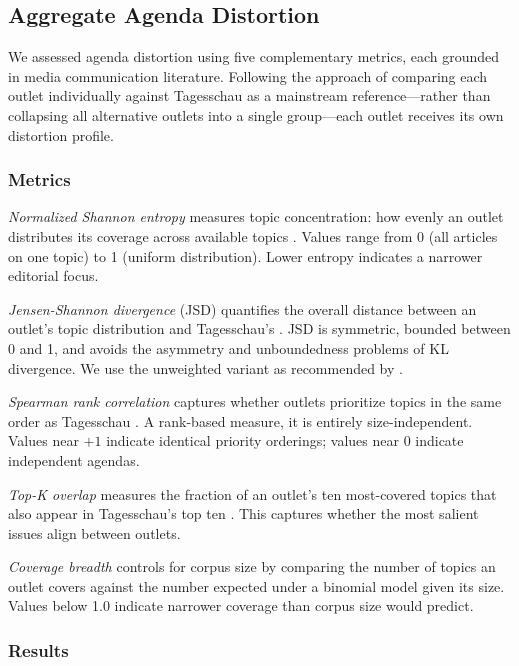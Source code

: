 \subsection{Aggregate Agenda Distortion}

We assessed agenda distortion using five complementary metrics, each grounded in media communication literature. Following the approach of comparing each outlet individually against Tagesschau as a mainstream reference---rather than collapsing all alternative outlets into a single group---each outlet receives its own distortion profile.

\subsubsection{Metrics}

\textit{Normalized Shannon entropy} measures topic concentration: how evenly an outlet distributes its coverage across available topics \parencite{boydstun2014importance}. Values range from 0 (all articles on one topic) to 1 (uniform distribution). Lower entropy indicates a narrower editorial focus.

\textit{Jensen-Shannon divergence} (JSD) quantifies the overall distance between an outlet's topic distribution and Tagesschau's \parencite{dimaggio2013exploiting}. JSD is symmetric, bounded between 0 and 1, and avoids the asymmetry and unboundedness problems of KL divergence. We use the unweighted variant as recommended by \textcite{gallagher2020divergent}.

\textit{Spearman rank correlation} captures whether outlets prioritize topics in the same order as Tagesschau \parencite{mccombs1972agenda}. A rank-based measure, it is entirely size-independent. Values near $+1$ indicate identical priority orderings; values near $0$ indicate independent agendas.

\textit{Top-K overlap} measures the fraction of an outlet's ten most-covered topics that also appear in Tagesschau's top ten \parencite{heidenreich2020media}. This captures whether the most salient issues align between outlets.

\textit{Coverage breadth} controls for corpus size by comparing the number of topics an outlet covers against the number expected under a binomial model given its size. Values below 1.0 indicate narrower coverage than corpus size would predict.

\subsubsection{Results}

